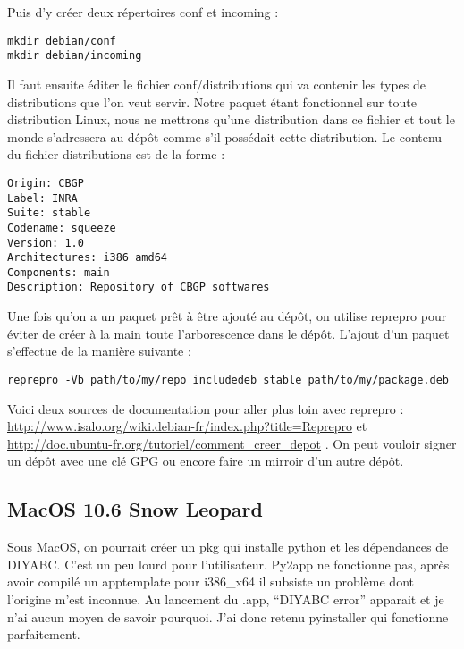 \documentclass[12pt,a4paper]{article}
\begin{document}
        Puis d'y créer deux répertoires conf et incoming :\\

        \begin{verbatim}mkdir debian/conf
mkdir debian/incoming \end{verbatim}

        Il faut ensuite éditer le fichier conf/distributions qui va contenir les
        types de distributions que l'on veut servir. Notre paquet étant
        fonctionnel sur toute distribution Linux, nous ne mettrons qu'une
        distribution dans ce fichier et tout le monde s'adressera au dépôt comme
        s'il possédait cette distribution. Le contenu du fichier distributions
        est de la forme : \\

        \begin{verbatim}Origin: CBGP
Label: INRA
Suite: stable
Codename: squeeze
Version: 1.0
Architectures: i386 amd64
Components: main
Description: Repository of CBGP softwares \end{verbatim}

        Une fois qu'on a un paquet prêt à être ajouté au dépôt, on utilise
        reprepro pour éviter de créer à la main toute l'arborescence dans le
        dépôt. L'ajout d'un paquet s'effectue de la manière suivante :\\

        \begin{verbatim}reprepro -Vb path/to/my/repo includedeb stable path/to/my/package.deb \end{verbatim}

        Voici deux sources de documentation pour aller plus loin avec reprepro
        :\newline
        \url{http://www.isalo.org/wiki.debian-fr/index.php?title=Reprepro}
        et\newline
        \url{http://doc.ubuntu-fr.org/tutoriel/comment_creer_depot} . On peut
        vouloir signer un dépôt avec une clé GPG ou encore faire un mirroir d'un
        autre dépôt.

    \subsection{MacOS 10.6 Snow Leopard}
        Sous MacOS, on pourrait cr\'eer un pkg qui installe python et les
        d\'ependances de DIYABC. C'est un peu lourd pour l'utilisateur. Py2app
        ne fonctionne pas, après avoir compil\'e un apptemplate pour i386\_x64
        il subsiste un problème dont l'origine m'est inconnue. Au lancement du
        .app, ``DIYABC error'' apparait et je n'ai aucun moyen de savoir
        pourquoi. J'ai donc retenu pyinstaller qui fonctionne parfaitement.\\
\end{document}
